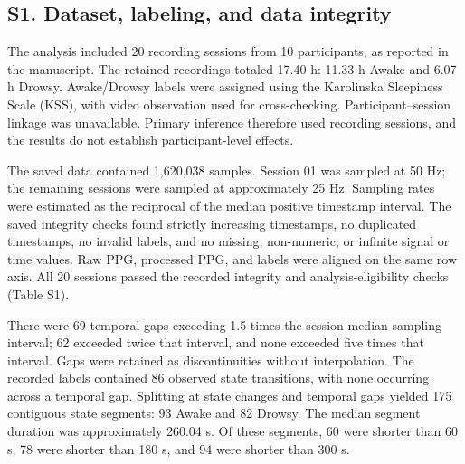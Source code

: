 \begingroup
\renewcommand{\thetable}{S\arabic{table}}
\renewcommand{\thefigure}{S\arabic{figure}}
\setcounter{table}{0}
\setcounter{figure}{0}
\subsection*{S1. Dataset, labeling, and data integrity}

The analysis included 20 recording sessions from 10 participants, as reported in the manuscript. The retained recordings totaled 17.40 h: 11.33 h Awake and 6.07 h Drowsy. Awake/Drowsy labels were assigned using the Karolinska Sleepiness Scale (KSS), with video observation used for cross-checking. Participant--session linkage was unavailable. Primary inference therefore used recording sessions, and the results do not establish participant-level effects.

The saved data contained 1,620,038 samples. Session 01 was sampled at 50 Hz; the remaining sessions were sampled at approximately 25 Hz. Sampling rates were estimated as the reciprocal of the median positive timestamp interval. The saved integrity checks found strictly increasing timestamps, no duplicated timestamps, no invalid labels, and no missing, non-numeric, or infinite signal or time values. Raw PPG, processed PPG, and labels were aligned on the same row axis. All 20 sessions passed the recorded integrity and analysis-eligibility checks (Table S1).

There were 69 temporal gaps exceeding 1.5 times the session median sampling interval; 62 exceeded twice that interval, and none exceeded five times that interval. Gaps were retained as discontinuities without interpolation. The recorded labels contained 86 observed state transitions, with none occurring across a temporal gap. Splitting at state changes and temporal gaps yielded 175 contiguous state segments: 93 Awake and 82 Drowsy. The median segment duration was approximately 260.04 s. Of these segments, 60 were shorter than 60 s, 78 were shorter than 180 s, and 94 were shorter than 300 s.

